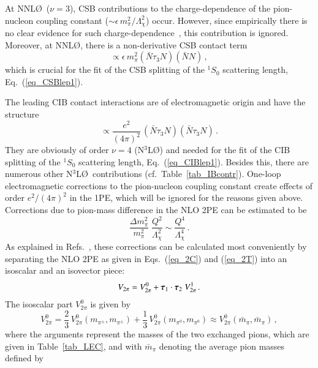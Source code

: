 \documentclass[sort&compress,preprint,3p]{elsarticle}
\newcommand{\bbox}[1]{\mbox{\boldmath $#1$}}
\begin{document}
At NNL\O \, ($\nu=3$), CSB contributions to the charge-dependence of the
pion-nucleon coupling constant ($\sim \epsilon \, m_\pi^2/\Lambda_\chi^2$) occur.
However, since empirically there is no clear evidence for such 
charge-dependence~\cite{STS93,MS01}, this contribution is ignored.
Moreover, at NNL\O, there is
a non-derivative CSB contact term
\begin{equation}
\propto \epsilon \, m_\pi^2 ( \bar{N} \tau_3 N)( \bar{N} N ) \,,
\label{eq_LCSB}
\end{equation}
which is crucial for the fit of the CSB splitting of the $^1S_0$ scattering length,
Eq.~(\ref{eq_CSBlep1}).

The leading CIB contact interactions are of electromagnetic origin and have the structure
\begin{equation}
\propto \frac{e^2}{(4\pi)^2} \, ( \bar{N} \tau_3 N)( \bar{N} \tau_3 N ) \,.
\label{eq_LCIB}
\end{equation}
They are obviously of order $\nu=4$ (N$^3$L\O) and
needed for the fit of the CIB splitting of the $^1S_0$ scattering length,
Eq.~(\ref{eq_CIBlep1}). Besides this, there are numerous other N$^3$L\O \, contributions
(cf.\ Table~\ref{tab_IBcontr}).
One-loop electromagnetic corrections to the pion-nucleon coupling constant
create effects of order $e^2/(4\pi)^2$ in the 1PE, which will be ignored for
the reasons given above. Corrections due to pion-mass difference in the NLO 2PE
can be estimated to be
\begin{equation}
\frac{\Delta m_\pi^2}{m_\pi^2} \;
\frac{Q^2}{\Lambda_\chi^2}
\sim 
\frac{Q^4}{\Lambda_\chi^4}
\,.
\end{equation}
As explained in Refs.~\cite{FK99,WME01}, these corrections can be calculated most conveniently
by separating the NLO 2PE as given in Eqs.~(\ref{eq_2C}) and (\ref{eq_2T})
 into an isoscalar and  an isovector piece:
 \begin{equation}
 V_{2\pi}=V_{2\pi}^0 +
\bbox{\tau}_1 \cdot \bbox{\tau}_2 \;
V_{2\pi}^1
\,.
\end{equation}
The isoscalar part $V_{2\pi}^0$ is given by~\cite{FK99}
\begin{equation}
V_{2\pi}^0 = \frac23 \, V_{2\pi}^0 (m_{\pi^\pm},m_{\pi^\pm}) + 
 \frac13 \, V_{2\pi}^0 (m_{\pi^0},m_{\pi^0}) 
 \approx  V_{2\pi}^0 (\bar{m}_{\pi},\bar{m}_{\pi}) 
 \,,
 \end{equation}
 where the arguments represent the masses of the two exchanged pions, which are given in
 Table~\ref{tab_LEC}, and with
 $\bar{m}_\pi$ denoting the average pion masses defined by
\end{document}
